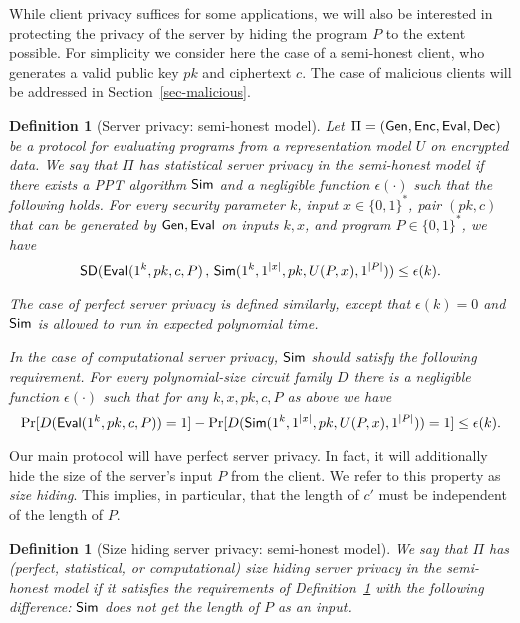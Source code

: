 \documentclass[11pt]{article}
\newtheorem{definition}[theorem]{Definition}
\newcommand{\eps}{{\epsilon}}
\newcommand{\SD}{{\sf SD }}
\newcommand{\gen}{{\sf Gen}}
\newcommand{\enc}{{\sf Enc}}
\newcommand{\eval}{{\sf Eval}}
\renewcommand{\sim}{{\sf Sim}}
\newcommand{\dec}{{\sf Dec}}
\newcommand{\mathify}[1]{\ifmmode{#1}\else\mbox{$#1$}\fi}
\newcommand{\set}[2][]{\mathify{{\left\{#2\right\}}^{#1}}}
\newcommand{\bools}[1][]{\set[#1]{0,1}}
\newcommand{\fnrngdom}[2]{#1\to#2}
\newcommand{\fndef}[3]{{#1\,:\,\fnrngdom{#2}{#3}}}
\newcommand{\size}[1]{\mathify{\left| #1 \right|}}
\begin{document}
While client privacy suffices for some applications, we will also be
interested in protecting the privacy of the server by hiding the
program $P$ to the extent possible.  For simplicity we consider here
the case of a semi-honest client, who generates a valid public key
$pk$ and ciphertext $c$. The case of malicious clients will be
addressed in Section~\ref{sec-malicious}.

\begin{definition}[Server privacy: semi-honest model]
\label{def-serverprivacy} Let $\Pi=(\gen,\enc,\eval,\dec)$ be a
protocol for evaluating programs from a representation model
$U$ on encrypted data. We say that $\Pi$ has {\em statistical
server privacy in the semi-honest model} if there exists a PPT
algorithm $\sim$ and a negligible function $\eps(\cdot)$ such that
the following holds. For every security parameter $k$, input
$x\in\{0,1\}^*$, pair $(pk,c)$ that can be generated by
$\gen,\eval$ on inputs $k,x$, and program $P\in\{0,1\}^*$, we have
\[ \SD(\eval(1^k,pk,c,P)\,,\,\sim(1^k, 1^{|x|},
pk, U(P,x), 1^{\size{P}})) \le \epsilon(k).\]

 The case of {\em  perfect server privacy} is defined
 similarly, except that
$\eps(k)=0$ and $\sim$ is allowed to run in expected polynomial
time.

In the case of {\em computational server privacy}, $\sim$ should
satisfy the following requirement. For every polynomial-size circuit
family $D$ there is a negligible function $\eps(\cdot)$ such that
for any $k,x,pk,c,P$ as above we have
\[ \Pr[D(\eval(1^k,pk,c,P))=1]-\Pr[D(\sim(1^k, 1^{|x|},
pk, U(P,x), 1^{\size{P}}))=1]
\le \eps(k).\]
\end{definition}

Our main protocol will have perfect server privacy. In fact, it will
additionally hide the size of the server's input $P$ from the
client.  We refer to this property as {\em size hiding}. This
implies, in particular, that the length of $c'$ must be independent
of the length of $P$.

\begin{definition}[Size hiding server privacy: semi-honest model]
\label{def-sizehiding} We say that $\Pi$ has (perfect, statistical,
or computational) {\em size hiding server privacy} in the
semi-honest model if it satisfies the requirements of
Definition~\ref{def-serverprivacy} with the following difference:
$\sim$ does not get the length of $P$ as an input.
\end{definition}
\end{document}
